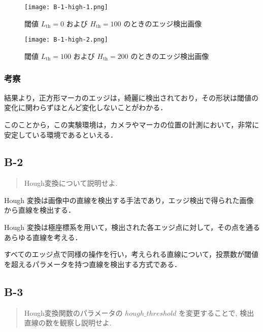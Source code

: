 \documentclass[fleqn, a4paper. 12pt]{jsarticle}
\begin{document}
        \begin{figure}[!h]
          \centering
          \texttt{[image: B-1-high-1.png]}
          \caption{閾値 \( L_{\text{th}} = 0 \) および \( H_{\text{th}} = 100 \) のときのエッジ検出画像}
          \label{fig:s4}
        \end{figure}

        \begin{figure}[!h]
          \centering
          \texttt{[image: B-1-high-2.png]}
          \caption{閾値 \( L_{\text{th}} = 100 \) および \( H_{\text{th}} = 200 \) のときのエッジ検出画像}
          \label{fig:s5}
        \end{figure}

      \subsubsection*{考察}

        結果より，正方形マーカのエッジは，綺麗に検出されており，その形状は閾値の変化に関わらずほとんど変化しないことがわかる．

        このことから，この実験環境は，カメラやマーカの位置の計測において，非常に安定している環境であるといえる．

    \subsection*{B-2}

      \begin{quote}
        Hough変換について説明せよ.
      \end{quote}

      Hough 変換は画像中の直線を検出する手法であり，エッジ検出で得られた画像から直線を検出する．
      
      Hough 変換は極座標系を用いて，検出された各エッジ点に対して，その点を通るあらゆる直線を考える．
      
      すべてのエッジ点で同様の操作を行い，考えられる直線について，投票数が閾値を超えるパラメータを持つ直線を検出する方式である．
      
    \subsection*{B-3}

      \begin{quote}
        Hough変換関数のパラメータの \( hough\_threshold \) を変更することで, 検出直線の数を観察し説明せよ.
      \end{quote}
\end{document}
